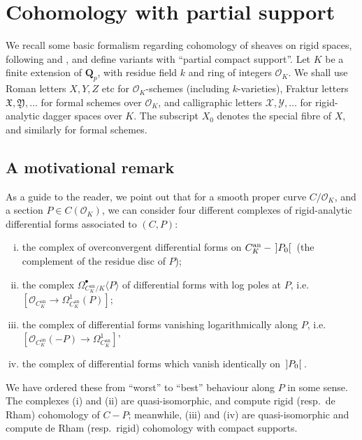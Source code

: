 \documentclass[cjm]{ipart}
\theoremstyle{plain}
\theoremstyle{remark}
\DeclarePairedDelimiter{\tb}{{\,]}}{{[\, }} %
\newcommand{\QQ}{\mathbf{Q}}
\newcommand{\Qp}{\QQ_p}
\newcommand{\cO}{\mathcal{O}}
\newcommand{\cX}{\mathcal{X}}
\newcommand{\cY}{\mathcal{Y}}
\numberwithin{equation}{subsection}
\begin{document}



\section{Cohomology with partial support}
\label{section:prelimrigcohom}

 We recall some basic formalism regarding cohomology of sheaves on rigid spaces, following \cite{lestum07} and \cite{grossekloenne00}, and define variants with ``partial compact support''. Let $K$ be a finite extension of $\Qp$, with residue field $k$ and ring of integers $\cO_K$. We shall use Roman letters $X, Y, Z$ etc for $\cO_K$-schemes (including $k$-varieties), Fraktur letters $\mathfrak{X}, \mathfrak{Y}, \dots$ for formal schemes over $\cO_K$, and calligraphic letters $\cX, \cY, \dots$ for rigid-analytic dagger spaces over $K$. The subscript $X_0$ denotes the special fibre of $X$, and similarly for formal schemes.

 \subsection{A motivational remark}

  As a guide to the reader, we point out that for a smooth proper curve $C / \cO_K$, and a section $P \in C(\cO_K)$, we can consider four different complexes of rigid-analytic differential forms associated to $(C, P)$:
  \begin{enumerate}[(i)]
  \item the complex of overconvergent differential forms on $C_K^{\mathrm{an}} - \tb{P_0}$ (the complement of the residue disc of $P$);
  \item the complex $\Omega^\bullet_{C_K^{\mathrm{an}} / K} \langle P \rangle$ of differential forms with log poles at $P$, i.e.~$[\cO_{C_K^{\mathrm{an}}} \longrightarrow \Omega^1_{C_K^{\mathrm{an}}}(P)]$;
  \item the complex of differential forms vanishing logarithmically along $P$, i.e.~$[\cO_{C_K^{\mathrm{an}}}(-P) \longrightarrow \Omega^1_{C_K^{\mathrm{an}}}]$'
  \item the complex of differential forms which vanish identically on $\tb{P_0}$.
  \end{enumerate}
  We have ordered these from ``worst'' to ``best'' behaviour along $P$ in some sense. The complexes (i) and (ii) are quasi-isomorphic, and compute rigid (resp.~de Rham) cohomology of $C - P$; meanwhile, (iii) and (iv) are quasi-isomorphic and compute de Rham (resp.~rigid) cohomology with compact supports.
\end{document}
